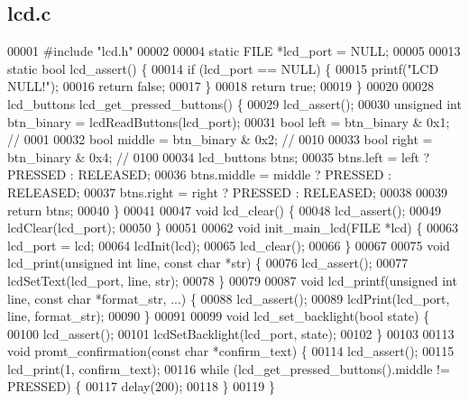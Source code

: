 \subsection{lcd.\+c}
\label{lcd_8c_source}

\begin{DoxyCode}
00001 \textcolor{preprocessor}{#include "lcd.h"}
00002 
00004 \textcolor{keyword}{static} FILE *lcd_port = NULL;
00005 
00013 \textcolor{keyword}{static} \textcolor{keywordtype}{bool} lcd_assert() \{
00014   \textcolor{keywordflow}{if} (lcd_port == NULL) \{
00015     printf(\textcolor{stringliteral}{"LCD NULL!"});
00016     \textcolor{keywordflow}{return} \textcolor{keyword}{false};
00017   \}
00018   \textcolor{keywordflow}{return} \textcolor{keyword}{true};
00019 \}
00020 
00028 lcd_buttons lcd_get_pressed_buttons() \{
00029   lcd_assert();
00030   \textcolor{keywordtype}{unsigned} \textcolor{keywordtype}{int} btn\_binary = lcdReadButtons(lcd_port);
00031   \textcolor{keywordtype}{bool} left = btn\_binary & 0x1;   \textcolor{comment}{// 0001}
00032   \textcolor{keywordtype}{bool} middle = btn\_binary & 0x2; \textcolor{comment}{// 0010}
00033   \textcolor{keywordtype}{bool} right = btn\_binary & 0x4;  \textcolor{comment}{// 0100}
00034   lcd_buttons btns;
00035   btns.left = left ? PRESSED : RELEASED;
00036   btns.middle = middle ? PRESSED : RELEASED;
00037   btns.right = right ? PRESSED : RELEASED;
00038 
00039   \textcolor{keywordflow}{return} btns;
00040 \}
00041 
00047 \textcolor{keywordtype}{void} lcd_clear() \{
00048   lcd_assert();
00049   lcdClear(lcd_port);
00050 \}
00051 
00062 \textcolor{keywordtype}{void} init_main_lcd(FILE *lcd) \{
00063   lcd_port = lcd;
00064   lcdInit(lcd);
00065   lcd_clear();
00066 \}
00067 
00075 \textcolor{keywordtype}{void} lcd_print(\textcolor{keywordtype}{unsigned} \textcolor{keywordtype}{int} line, \textcolor{keyword}{const} \textcolor{keywordtype}{char} *str) \{
00076   lcd_assert();
00077   lcdSetText(lcd_port, line, str);
00078 \}
00079 
00087 \textcolor{keywordtype}{void} lcd_printf(\textcolor{keywordtype}{unsigned} \textcolor{keywordtype}{int} line, \textcolor{keyword}{const} \textcolor{keywordtype}{char} *format\_str, ...) \{
00088   lcd_assert();
00089   lcdPrint(lcd_port, line, format\_str);
00090 \}
00091 
00099 \textcolor{keywordtype}{void} lcd_set_backlight(\textcolor{keywordtype}{bool} state) \{
00100   lcd_assert();
00101   lcdSetBacklight(lcd_port, state);
00102 \}
00103 
00113 \textcolor{keywordtype}{void} promt_confirmation(\textcolor{keyword}{const} \textcolor{keywordtype}{char} *confirm\_text) \{
00114   lcd_assert();
00115   lcd_print(1, confirm\_text);
00116   \textcolor{keywordflow}{while} (lcd_get_pressed_buttons().middle != PRESSED) \{
00117     delay(200);
00118   \}
00119 \}
\end{DoxyCode}
